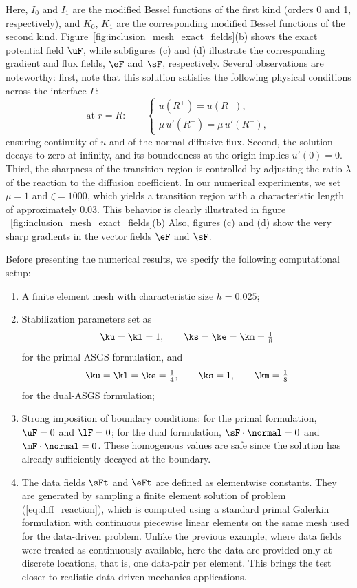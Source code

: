 Here, $I_{0}$ and $I_{1}$ are the modified Bessel functions of the first kind (orders 0 and 1, respectively), and $K_{0}$, $K_{1}$ are the corresponding modified Bessel functions of the second kind. Figure~\ref{fig:inclusion_mesh_exact_fields}(b) shows the exact potential field $\uF$, while subfigures (c) and (d) illustrate the corresponding gradient and flux fields, $\eF$ and $\sF$, respectively. Several observations are noteworthy: first, note that this solution satisfies the following physical conditions across the interface $\Gamma$:
$$
\text{at } r=R:\qquad
\begin{cases}
	u(R^{+}) = u(R^{-}), \\[3pt]
	\mu\,u'(R^{+}) = \mu\,u'(R^{-}),
\end{cases}
$$
ensuring continuity of $u$ and of the normal diffusive flux. 
Second, the solution decays to zero at infinity, and its boundedness at the origin implies $u'(0) = 0$. Third, the sharpness of the transition region is controlled by adjusting the ratio $\lambda$ of the reaction to the diffusion coefficient. In our numerical experiments, we set $\mu = 1$ and $\zeta = 1000$, which yields a transition region with a characteristic length of approximately $0.03$. This behavior is clearly illustrated in figure ~\ref{fig:inclusion_mesh_exact_fields}(b) Also, figures (c) and (d) show the very sharp gradients in the vector fields $\eF$ and $\sF$.

Before presenting the numerical results, we specify the following computational setup:
\begin{enumerate}
\item[(i)] A finite element mesh with characteristic size $h = 0.025$;
\item[(ii)] Stabilization parameters set as
\[
\ku = \kl = 1, \qquad \ks = \ke = \km = \tfrac{1}{8}
\]
for the primal-ASGS formulation, and
\[
\ku = \kl = \ke = \tfrac{1}{4}, \qquad \ks = 1, \qquad \km = \tfrac{1}{8}
\]
for the dual-ASGS formulation;

\item[(iii)] Strong imposition of boundary conditions: for the primal formulation, $\uF = 0$ and $\lF = 0$; for the dual formulation, $\sF \cdot \normal = 0$ and $\mF \cdot \normal = 0$. These
homogenous values are safe since the solution has already sufficiently decayed at the boundary.

\item[(iv)] The data fields $\sFt$ and $\eFt$ are defined as elementwise constants. 
They are generated by sampling a finite element solution of problem (\ref{eq:diff_reaction}),
which is computed using a standard primal Galerkin formulation with continuous piecewise
linear elements on the same mesh used for the data-driven problem. Unlike the previous example, where data fields were treated as continuously available, here the data are provided only at discrete locations, that is, one data-pair per element. This brings the test closer to 
realistic data-driven mechanics applications.
\end{enumerate}

